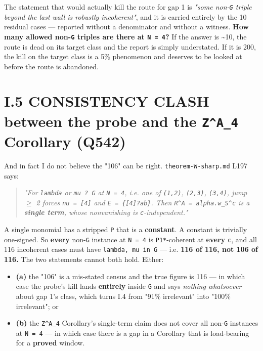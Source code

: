 \documentclass[11pt,a4paper]{article}
\begin{document}
The statement that would actually kill the route for gap 1 is \emph{"some non-\mbox{\texttt{G}} triple beyond the last wall is robustly incoherent"}, and it is carried entirely by the 10 residual cases --- reported without a denominator and without a witness. \textbf{How many allowed non-\mbox{\texttt{G}} triples are there at \mbox{\texttt{N = 4}}?} If the answer is \textasciitilde{}10, the route is dead on its target class and the report is simply understated. If it is 200, the kill on the target class is a 5\% phenomenon and deserves to be looked at before the route is abandoned.

\section*{I.5 CONSISTENCY CLASH between the probe and the \mbox{\texttt{Z\textasciicircum{}A\_4}} Corollary (Q542)}

And in fact I do not believe the "106" can be right. \mbox{\texttt{theorem-W-sharp.md}} L197 says:

\begin{quote}\itshape \emph{"For \mbox{\texttt{lambda}} or \mbox{\texttt{mu ? G}} at \mbox{\texttt{N = 4}}, i.e. one of \mbox{\texttt{(1,2)}}, \mbox{\texttt{(2,3)}}, \mbox{\texttt{(3,4)}}, jump $\geq$ 2 forces \mbox{\texttt{nu = [4]}} and \mbox{\texttt{E = \{[4]?ab\}}}. Then \mbox{\texttt{R\textasciicircum{}A = alpha.w\_S\textasciicircum{}c}} is a \textbf{single term}, whose nonvanishing is \mbox{\texttt{c}}-independent."}\end{quote}

A single monomial has a stripped \mbox{\texttt{P}} that is a \textbf{constant}. A constant is trivially one-signed. So \textbf{every} non-\mbox{\texttt{G}} instance at \mbox{\texttt{N = 4}} is \mbox{\texttt{P1*}}-coherent at \textbf{every} \mbox{\texttt{c}}, and all 116 incoherent cases must have \mbox{\texttt{lambda, mu in G}} --- i.e. \textbf{116 of 116, not 106 of 116.} The two statements cannot both hold. Either:

\begin{itemize}
\item \textbf{(a)} the "106" is a mis-stated census and the true figure is 116 --- in which case the probe's kill lands \textbf{entirely} inside \mbox{\texttt{G}} and says \emph{nothing whatsoever} about gap 1's class, which turns I.4 from "91\% irrelevant" into "100\% irrelevant"; or
\item \textbf{(b)} the \mbox{\texttt{Z\textasciicircum{}A\_4}} Corollary's single-term claim does not cover all non-\mbox{\texttt{G}} instances at \mbox{\texttt{N = 4}} --- in which case there is a gap in a Corollary that is load-bearing for a \textbf{proved} window.
\end{itemize}
\end{document}
